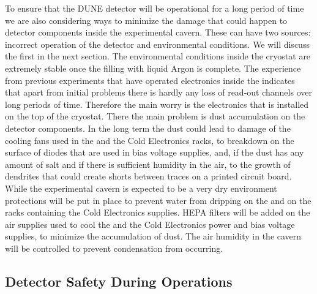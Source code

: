 To ensure that the DUNE detector will be operational for a long
period of time we are also considering ways to minimize the
damage that could happen to detector components inside the 
experimental cavern. These can have two sources: incorrect
operation of the detector and environmental conditions. We
will discuss the first in the next section. The environmental
conditions inside the cryostat are extremely stable once the
filling with liquid Argon is complete. The experience from 
previous experiments that have operated electronics inside the
 indicates that apart from initial problems there
is hardly any loss of read-out channels over long periods of
time. Therefore the main worry is the electronics that is
installed on the top of the cryostat. There the main problem
is dust accumulation on the detector components. In the long
term the dust could lead to damage of the cooling fans used
in the  and the Cold Electronics racks, to breakdown 
on the surface of diodes that are used in bias voltage supplies,
and, if the dust has any amount of salt and if there is sufficient humidity
in the air, to the growth of dendrites that could create 
shorts between traces on a printed circuit board. While the
experimental cavern is expected to be a very dry environment
protections will be put in place to prevent water from 
dripping on the  and on the racks containing the
Cold Electronics supplies. HEPA filters will be added on the
air supplies used to cool the  and the Cold
Electronics power and bias voltage supplies, to minimize
the accumulation of dust. The air humidity in the cavern 
will be controlled to prevent condensation from occurring.

\subsection{Detector Safety During Operations}
\label{sec:fdsp-tpcelec-safety-detops}

